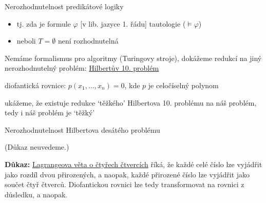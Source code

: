 \documentclass{beamer}
\begin{document}
\begin{frame}{Nerozhodnutelnost predikátové logiky}
    

    \begin{itemize}
        \item tj. zda je formule $\varphi$ [v lib. jazyce 1. řádu] tautologie ($\models\varphi$)
        \item neboli $T=\emptyset$ není rozhodnutelná 
    \end{itemize}

    Nemáme formalismus pro algoritmy (Turingovy stroje), dokážeme redukcí na jiný nerozhodnutelný problém: \alert{\href{https://en.wikipedia.org/wiki/Hilbert\%27s_problems}{Hilbertův 10. problém}}

    \bigskip


    \medskip

    \alert{diofantická rovnice}: $p(x_1,\dots,x_n)=0$, kde $p$ je celočíselný polynom


    ukážeme, že existuje \alert{redukce} `těžkého' Hilbertova 10. problému na náš problém, tedy i náš problém je `těžký'
    
\end{frame}


\begin{frame}{Nerozhodnutelnost Hilbertova desátého problému}


    (Důkaz neuvedeme.)

    \medskip

    
    \textbf{Důkaz:} \alert{\href{https://en.wikipedia.org/wiki/Lagrange\%27s_four-square_theorem}{Lagrangeova věta o čtyřech čtvercích}} říká, že každé celé číslo lze vyjádřit jako rozdíl dvou přirozených, a naopak, každé přirozené číslo lze vyjádřit jako součet čtyř čtverců. Diofantickou rovnici lze tedy transformovat na rovnici z důsledku, a naopak.\hfill\qedsymbol

\end{frame}
\end{document}
